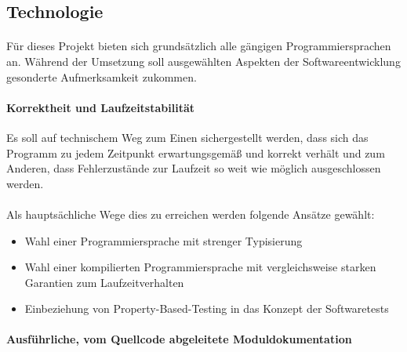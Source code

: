 \subsection{Technologie}
\paragraph{}
Für dieses Projekt bieten sich grundsätzlich alle gängigen Programmiersprachen
an. Während der Umsetzung soll ausgewählten Aspekten der Softwareentwicklung
gesonderte Aufmerksamkeit zukommen.

\paragraph{Korrektheit und Laufzeitstabilität} Es soll auf technischem Weg zum
Einen sichergestellt werden, dass sich das Programm zu jedem Zeitpunkt erwartungsgemäß
und korrekt verhält und zum Anderen, dass Fehlerzustände zur Laufzeit so weit
wie möglich ausgeschlossen werden.

\paragraph{}
Als hauptsächliche Wege dies zu erreichen werden folgende Ansätze gewählt:

\begin{itemize}
    \item Wahl einer Programmiersprache mit strenger Typisierung
    \item Wahl einer kompilierten Programmiersprache mit vergleichsweise starken
          Garantien zum Laufzeitverhalten
    \item Einbeziehung von \gls{Property-Based-Testing} in das Konzept der Softwaretests
\end{itemize}

\paragraph{Ausführliche, vom Quellcode abgeleitete Moduldokumentation}
